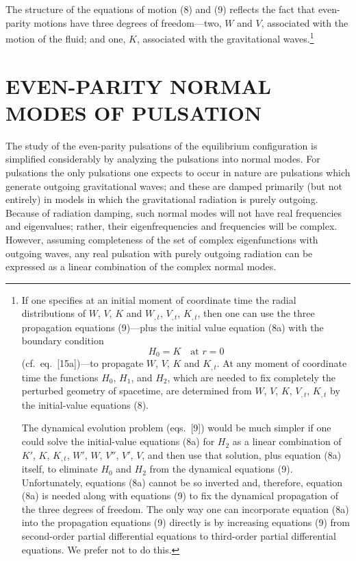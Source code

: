 \documentclass[12pt]{article}
\begin{document}
The structure of the equations of motion (8) and (9) reflects the fact that even-parity
motions have three degrees of freedom---two, $W$ and $V$, associated with the motion of
the fluid; and one, $K$, associated with the gravitational waves.\footnote{If one specifies at an
initial moment of coordinate time the radial distributions of $W$, $V$, $K$ and $W_{,t}$, $V_{,t}$, $K_{,t}$,
then one can use the three propagation equations (9)---plus the initial value equation
(8a) with the boundary condition
\begin{equation}
  H_0 = K \quad \text{at } r = 0
\label{eq:10}
\end{equation}
(cf.\ eq.\ [15a])---to propagate $W$, $V$, $K$ and $K_{,t}$. At any moment of coordinate
time the functions $H_0$, $H_1$, and $H_2$, which are needed to fix completely the perturbed
geometry of spacetime, are determined from $W$, $V$, $K$, $V_{,t}$, $K_{,t}$ by the initial-value
equations (8).

The dynamical evolution problem (eqs.\ [9]) would be much simpler if one could solve
the initial-value equations (8a) for $H_2$ as a linear combination of $K'$, $K$, $K_{,t}$, $W'$, $W$,
$V''$, $V'$, $V$, and then use that solution, plus equation (8a) itself, to eliminate $H_0$ and $H_2$
from the dynamical equations (9). Unfortunately, equations (8a) cannot be so inverted
and, therefore, equation (8a) is needed along with equations (9) to fix the dynamical
propagation of the three degrees of freedom. The only way one can incorporate equation
(8a) into the propagation equations (9) directly is by increasing equations (9) from
second-order partial differential equations to third-order partial differential equations. We
prefer not to do this.}

\section{EVEN-PARITY NORMAL MODES OF PULSATION}

The study of the even-parity pulsations of the equilibrium configuration is simplified
considerably by analyzing the pulsations into normal modes. For pulsations the only pulsations
one expects to occur in nature are pulsations which generate outgoing gravitational
waves; and these are damped primarily (but not entirely) in models in which the
gravitational radiation is purely outgoing. Because of radiation damping, such normal
modes will not have real frequencies and eigenvalues; rather, their eigenfrequencies
and frequencies will be complex. However, assuming completeness of the set of
complex eigenfunctions with outgoing waves, any real pulsation with purely outgoing
radiation can be expressed as a linear combination of the complex normal modes.
\end{document}
